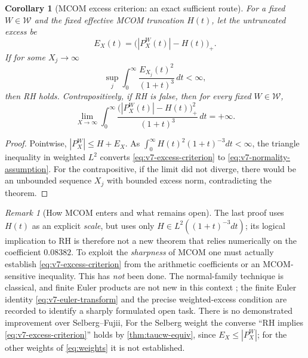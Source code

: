 \documentclass[11pt,a4paper]{article}
\numberwithin{equation}{section}
\newtheorem{corollary}[theorem]{Corollary}
\theoremstyle{definition}
\theoremstyle{remark}
\newtheorem{remark}[theorem]{Remark}
\begin{document}
\begin{corollary}[MCOM excess criterion: an exact sufficient route]
\label{cor:v7-excess}
For a fixed $W\in\mathcal W$ and the fixed effective MCOM truncation $H(t)$,
let the \emph{untruncated excess} be
\begin{equation}\label{eq:v7-excess}
 E_X(t)=\bigl(|P_X^W(t)|-H(t)\bigr)_+.
\end{equation}
If for some $X_j\to\infty$
\begin{equation}\label{eq:v7-excess-criterion}
 \sup_j\int_0^\infty\frac{E_{X_j}(t)^2}{(1+t)^3}\,dt<\infty,
\end{equation}
then RH holds. Contrapositively, if RH is false, then for
every fixed $W\in\mathcal W$,
\begin{equation}\label{eq:v7-excess-diverges}
 \lim_{X\to\infty}\int_0^\infty
 \frac{\bigl(|P_X^W(t)|-H(t)\bigr)_+^2}{(1+t)^3}\,dt=+\infty.
\end{equation}
\end{corollary}
\begin{proof}
Pointwise, $|P_X^W|\le H+E_X$. As
$\int_0^\infty H(t)^2(1+t)^{-3}dt<\infty$, the triangle
inequality in weighted $L^2$ converts
\eqref{eq:v7-excess-criterion} to
\eqref{eq:v7-normality-assumption}. For the contrapositive,
if the limit did not diverge, there would be an unbounded
sequence $X_j$ with bounded excess norm, contradicting
the theorem.
\end{proof}

\begin{remark}[How MCOM enters and what remains open]
The last proof uses $H(t)$ as an explicit \emph{scale}, but
uses only $H\in L^2((1+t)^{-3}dt)$; its logical implication
to RH is therefore not a new theorem that relies numerically
on the coefficient $0.08382$. To exploit the \emph{sharpness}
of MCOM one must actually establish
\eqref{eq:v7-excess-criterion} from the arithmetic coefficients
or an MCOM-sensitive inequality. This has \emph{not} been done.
The normal-family technique is classical, and finite Euler products are not new in this context \cite{Gonek2012}; the finite Euler
identity \eqref{eq:v7-euler-transform} and the precise
weighted-excess condition are recorded to identify a
sharply formulated open task. There is no demonstrated
improvement over Selberg--Fujii, For the Selberg weight the converse ``RH
implies \eqref{eq:v7-excess-criterion}'' holds by \cref{thm:taucw-equiv}, since $E_X\le|P^W_X|$; for the other weights of \eqref{eq:weights} it is not established.
\end{remark}
\end{document}
